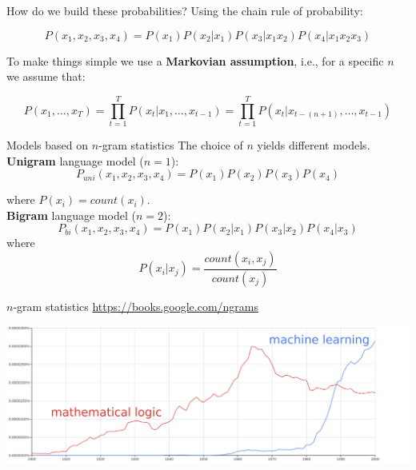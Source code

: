 \documentclass[10pt]{beamer}
\begin{document}
\begin{frame}{How do we build these probabilities?}
Using the chain rule of probability: 

\begin{equation*}
P(x_1,x_2,x_3,x_4) = P(x_1)P(x_2\vert x_1)P(x_3\vert x_1x_2)P(x_4\vert x_1x_2x_3)
\end{equation*}

\vspace{0.3cm}

To make things simple we use a \textbf{Markovian assumption}, i.e., for a specific $n$ we assume that:

\begin{equation*}
P(x_1, \dots, x_T) = \prod_{t=1}^{T} P(x_t \vert x_1, \dots, x_{t-1}) = \prod_{t=1}^{T} P(x_{t} \vert x_{t - (n+1)}, \dots, x_{t-1})
\end{equation*}	

\end{frame}

\begin{frame}{Models based on $n$-gram statistics}
The choice of $n$ yields different models.\\

\textbf{Unigram} language model ($n=1$): 
\begin{equation*}
P_{uni}(x_1, x_2, x_3, x_4) = P(x_1)P(x_2)P(x_3)P(x_4)
\end{equation*}

where $P(x_i) = count(x_i)$.\\

\textbf{Bigram} language model ($n=2$): 
\begin{equation*}
P_{bi}(x_1,x_2,x_3,x_4) = P(x_1)P(x_2\vert x_1)P(x_3\vert x_2)P(x_4\vert x_3)
\end{equation*}	
where
\[
P(x_i\vert x_j) = \frac{count(x_i, x_j)}{count(x_j)}
\]
\end{frame}

\begin{frame}{$n$-gram statistics}
\url{https://books.google.com/ngrams}
\vspace{0.4cm}

\includegraphics[scale=0.17]{images/mlXml.png}
\end{frame}
\end{document}
